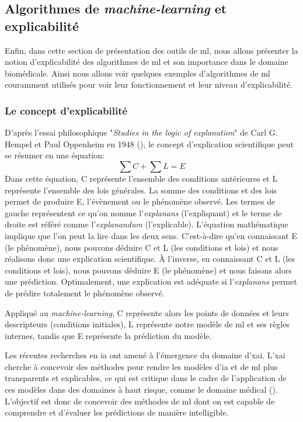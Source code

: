 \subsection{Algorithmes de \textit{machine-learning} et explicabilité}
Enfin, dans cette section de présentation des outils de \gls{ml}, nous allons présenter la notion d'explicabilité des algorithmes de \gls{ml} et son importance dans le domaine biomédicale. Ainsi nous allons voir quelques exemples d'algorithmes de \gls{ml} couramment utilisés pour voir leur fonctionnement et leur niveau d'explicabilité.

\subsubsection{Le concept d'explicabilité}
D'après l'essai philosophique "\textit{Studies in the logic of explanation}" de Carl G. Hempel et Paul Oppenheim en 1948 (\cite{hempel_studies_1948}), le concept d'explication scientifique peut se résumer en une équation:
\[\sum C + \sum L = E\]
Dans cette équation, C représente l'ensemble des conditions antérieures et L représente l'ensemble des lois générales. La somme des conditions et des lois permet de produire E, l'évènement ou le phénomène observé. Les termes de gauche représentent ce qu’on nomme l’\textit{explanans} (l’expliquant) et le terme de droite est référé comme l’\textit{explanandum} (l’explicable). L’équation mathématique implique que l’on peut la lire dans les deux sens. C’est-à-dire qu’en connaissant E (le phénomène), nous pouvons déduire C et L (les conditions et lois) et nous réalisons donc une explication scientifique. À l’inverse, en connaissant C et L (les conditions et lois), nous pouvons déduire E (le phénomène) et nous faisons alors une prédiction. Optimalement, une explication est adéquate si l’\textit{explanans} permet de prédire totalement le phénomène observé.

Appliqué au \textit{machine-learning}, C représente alors les points de données et leurs descripteurs (conditions initiales), L représente notre modèle de \gls{ml} et ses règles internes, tandis que E représente la prédiction du modèle.

Les récentes recherches en \gls{ia} ont amené à l'émergence du domaine d'\gls{xai}. L'\gls{xai} cherche à concevoir des méthodes pour rendre les modèles d'\gls{ia} et de \gls{ml} plus transparents et explicables, ce qui est critique dans le cadre de l'application de ces modèles dans des domaines à haut risque, comme le domaine médical (\cite{arrieta_explainable_2019}). L'objectif est donc de concevoir des méthodes de \gls{ml} dont on est capable de comprendre et d'évaluer les prédictions de manière intelligible.

